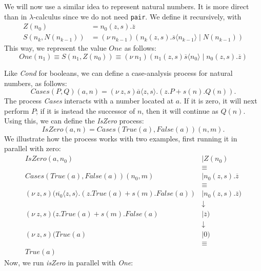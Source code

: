\documentclass[a4paper, openany]{memoir}
\theoremstyle{definition}
\begin{document}
    We will now use a similar idea to represent natural numbers. It is more direct than in $\lambda$-calculus since we do not need \texttt{pair}. We define it recursively, with
    \begin{align*}
        Z(n_0) &= n_0(z, s).\overline{z} \\
        S(n_k, N(n_{k-1})) &= (\nu \ n_{k-1})(n_k(z, s).\overline{s} \langle n_{k-1} \rangle \mid N(n_{k-1}))
    \end{align*}
    This way, we represent the value $\textit{One}$ as follows:
    \[\textit{One}(n_1) \equiv S(n_1, Z(n_0)) \equiv (\nu \ n_1)(n_1(z, s) \overline{s} \langle n_0 \rangle \mid n_0(z, s).\overline{z})\]
    
    Like \textit{Cond} for booleans, we can define a case-analysis process for natural numbers, as follows:
    \[\textit{Cases}(P, Q)(a, n) = (\nu \ z, s)\overline{a} \langle z, s \rangle.(z.P + s(n).Q(n)).\]
    The process \textit{Cases} interacts with a number located at $a$. If it is zero, it will next perform $P$; if it is instead the successor of $n$, then it will continue as $Q(n)$. Using this, we can define the \textit{IsZero} process:
    \[\textit{IsZero}(a, n) = \textit{Cases}(\textit{True}(a), \textit{False}(a))(n, m).\]
    We illustrate how the process works with two examples, first running it in parallel with zero:
    \begin{align*}
        \textit{IsZero}(a, n_0) &\mid Z(n_0) \\
        &\equiv \\
        \textit{Cases}(\textit{True}(a), \textit{False}(a))(n_0, m) &\mid n_0(z, s).\overline{z} \\
        &\equiv \\
        (\nu \ z, s)(\overline{n_0} \langle z, s \rangle.(z.\textit{True}(a) + s(m).\textit{False}(a)) &\mid n_0(z, s).\overline{z}) \\
        &\downarrow \\
        (\nu \ z, s)(z.\textit{True}(a) + s(m).\textit{False}(a) &\mid \overline{z}) \\
        &\downarrow \\
        (\nu \ z, s)(\textit{True}(a) &\mid 0) \\
        &\equiv \\
        \textit{True}(a)
    \end{align*}
    Now, we run \textit{isZero} in parallel with \textit{One}:
\end{document}
